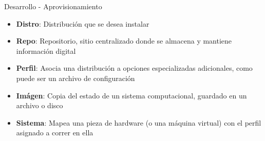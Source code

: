\begin{frame}{Desarrollo - Aprovisionamiento}
    \vspace{-1.5cm}
    \begin{itemize}
        \item \textbf{Distro}: Distribución que se desea instalar
        \item \textbf{Repo}: Repositorio, sitio centralizado donde se almacena y mantiene información digital
        \item \textbf{Perfil}: Asocia una distribución a opciones especializadas adicionales, como puede ser un archivo de configuración
        \item \textbf{Imágen}: Copia del estado de un sistema computacional, guardado en un archivo o disco
        \item \textbf{Sistema}: Mapea una pieza de hardware (o una máquina virtual) con el perfil asignado a correr en ella
    \end{itemize}

\end{frame}

